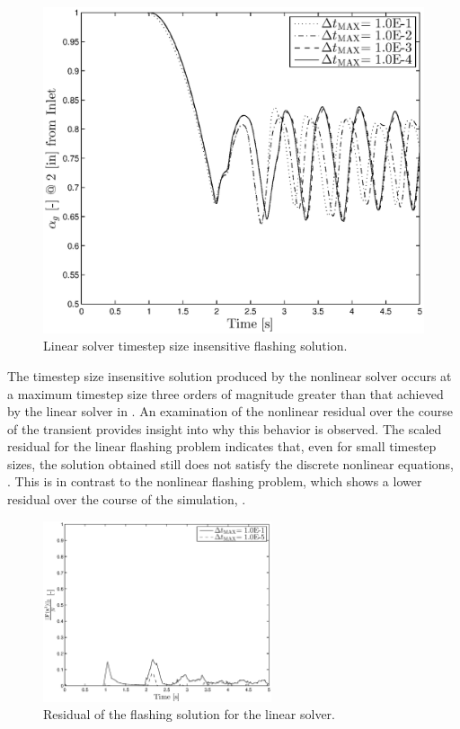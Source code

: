 \begin{figure}[h!tb]
\centering
\includegraphics[width=.6\textwidth]{plots/lin_flashing_1em1_1em4.eps}
\caption{Linear solver timestep size insensitive flashing solution.}
\label{fig:cobra_flashing_compare}
\end{figure}

The timestep size insensitive solution produced by the nonlinear solver occurs at a maximum timestep size three orders of magnitude greater than that achieved by the linear solver in \cobra{}.
An examination of the nonlinear residual over the course of the transient provides insight into why this behavior is observed.
The scaled residual for the linear flashing problem indicates that, even for small timestep sizes, the solution obtained still does not satisfy the discrete nonlinear equations, .
This is in contrast to the nonlinear flashing problem, which shows a lower residual over the course of the simulation, .

\begin{figure}[h!tb]
\centering
\includegraphics[width=0.6\textwidth]{plots/lin_flashing_res_compare.eps}
\caption{Residual of the flashing solution for the linear solver.}
\label{fig:linear_flashing_residual}
\end{figure}

